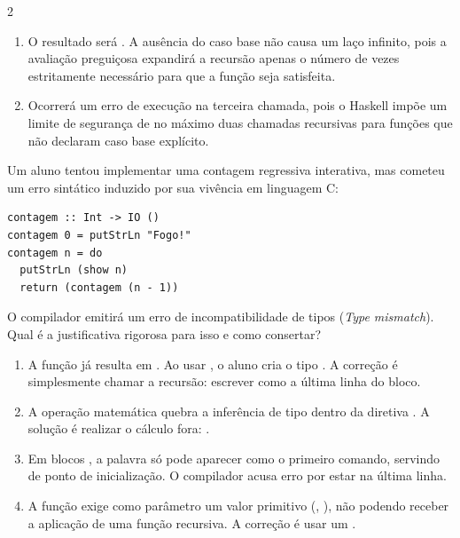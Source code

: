\documentclass[a4paper,10pt,brazil]{article}
\begin{document}
\begin{multicols}{2}
\begin{enumerate}
  \item O resultado será \haskellinline{[10, 12, 14]}. A ausência do caso base não causa um laço infinito, pois a avaliação preguiçosa expandirá a recursão apenas o número de vezes estritamente necessário para que a função  seja satisfeita.

  \item Ocorrerá um erro de execução na terceira chamada, pois o Haskell impõe um limite de segurança de no máximo duas chamadas recursivas para funções que não declaram caso base explícito.

\end{enumerate}

Um aluno tentou implementar uma contagem regressiva interativa, mas cometeu um erro sintático induzido por sua vivência em linguagem C:

\begin{verbatim}
contagem :: Int -> IO ()
contagem 0 = putStrLn "Fogo!"
contagem n = do
  putStrLn (show n)
  return (contagem (n - 1))
\end{verbatim}

O compilador emitirá um erro de incompatibilidade de tipos (\emph{Type mismatch}). Qual é a justificativa rigorosa para isso e como consertar?

\begin{enumerate}
  \item A função  já resulta em . Ao usar , o aluno cria o tipo . A correção é simplesmente chamar a recursão: escrever  como a última linha do bloco.

  \item A operação matemática  quebra a inferência de tipo dentro da diretiva . A solução é realizar o cálculo fora: .
  \item Em blocos , a palavra  só pode aparecer como o primeiro comando, servindo de ponto de inicialização. O compilador acusa erro por estar na última linha.

  \item A função  exige como parâmetro um valor primitivo (, ), não podendo receber a aplicação de uma função recursiva. A correção é usar um .


\end{enumerate}
\end{multicols}
\end{document}
